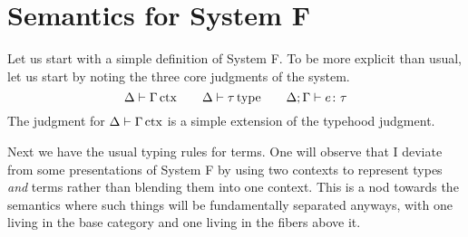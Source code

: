 \section{Semantics for System F}

Let us start with a simple definition of System F. To be more explicit
than usual, let us start by noting the three core judgments of the
system.
\[
  \Delta \vdash \Gamma\,\mathrm{ctx} \qquad \Delta \vdash \tau\,\mathrm{type} \qquad \Delta; \Gamma \vdash e \colon \tau
\]
The judgment for $\Delta \vdash \Gamma\,\mathrm{ctx}$ is a simple extension of the
typehood judgment.

Next we have the usual typing rules for terms. One will observe that I
deviate from some presentations of System F by using two contexts to
represent types \emph{and} terms rather than blending them into one
context. This is a nod towards the semantics where such things will be
fundamentally separated anyways, with one living in the base category
and one living in the fibers above it.


